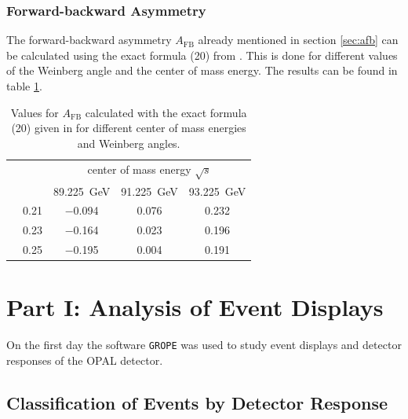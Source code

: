 \documentclass[11pt, a4paper]{article}
\numberwithin{equation}{section}
\begin{document}
\subsubsection{Forward-backward Asymmetry}

The forward-backward asymmetry $A_\mathrm{FB}$ already mentioned in section \ref{sec:afb} can be calculated using the exact formula (20) from \cite{instructions}.
This is done for different values of the Weinberg angle and the center of mass energy.
The results can be found in table \ref{tab:afb_theory}. 
\begin{table}[H]
	\centering
	\begin{tabular}{cl|ccc}
	& 			& \multicolumn{3}{c}{center of mass energy $\sqrt{s}$} 		\\
	&			& \SI{89.225}{GeV} 	& \SI{91.225}{GeV} 	& \SI{93.225}{GeV} 	\\\hline
	\multirow{3}{*}{\rotatebox{90}{$\sin^2\theta_\mathrm{W}$}}
	& \num{0.21} 	& \num{-0.094} 		& \num{0.076}		& \num{0.232}		\\
	& \num{0.23} 	& \num{-0.164}		& \num{0.023}		& \num{0.196}		\\
	& \num{0.25}	& \num{-0.195}		& \num{0.004}		& \num{0.191} 		\\	
	\end{tabular}
	\caption{Values for $A_\mathrm{FB}$ calculated with the exact formula (20) given in \cite{instructions} for different center of mass energies and Weinberg angles.}
	\label{tab:afb_theory}
\end{table}

\clearpage
\section{Part I: Analysis of Event Displays}

On the first day the software \texttt{GROPE} was used to study event displays and detector responses of the OPAL detector.

\subsection{Classification of Events by Detector Response}
\end{document}
